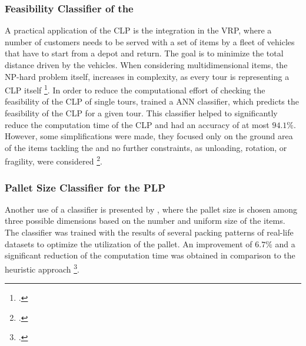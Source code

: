 \subsubsection{Feasibility Classifier of the }
A practical application of the \gls{CLP} is the integration in the \gls{VRP}, where
a number of customers needs to be served with a set of items by a fleet of vehicles that have
to start from a depot and return. The goal is to minimize the total distance driven
by the vehicles. When considering multidimensional items, the NP-hard problem itself,
increases in complexity, as every tour is representing a \gls{CLP} itself \footcite[cf.][pp. 1--2]{tamke_branch-and-cut_2024}.
In order to reduce the computational effort of checking the feasibility of the \gls{CLP}
of single tours, \citeauthor{zhang_learning-based_2022} trained a \gls{ANN} classifier, which predicts
the feasibility of the \gls{CLP} for a given tour. This classifier helped to significantly
reduce the computation time of the \gls{CLP} and had an accuracy of at most $94.1\%$.
However, some simplifications were made, they focused only on the ground area of the items
tackling the  and no further constraints, as unloading, rotation,
or fragility, were considered \footcite[cf.][pp. 4, 14]{zhang_learning-based_2022}.

\subsubsection{Pallet Size Classifier for the \gls{PLP}}
Another use of a classifier is presented by \citeauthor{aylak_application_2021}, where the pallet
size is chosen among three possible dimensions based on the number and uniform size of the items.
The classifier was trained with the results of several packing patterns of real-life datasets
to optimize the utilization of the pallet. An improvement of $6.7\%$ and a significant reduction
of the computation time was obtained in comparison to the heuristic approach
\footcite[cf.][pp. 12--14]{aylak_application_2021}.\parbreak
